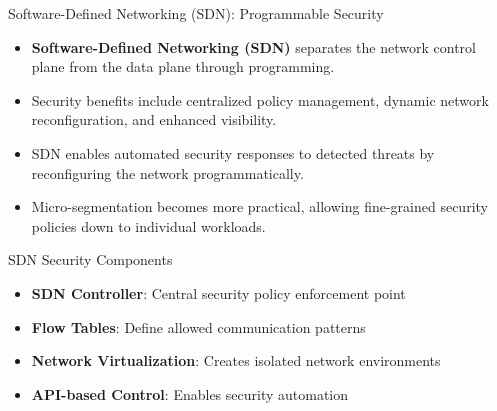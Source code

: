 \documentclass{beamer}
\begin{document}
        \begin{frame}{Software-Defined Networking (SDN): Programmable Security}
            \begin{itemize}
            \item \textbf{Software-Defined Networking (SDN)} separates the network control plane from the data plane through programming.
            \item Security benefits include centralized policy management, dynamic network reconfiguration, and enhanced visibility.
            \item SDN enables automated security responses to detected threats by reconfiguring the network programmatically.
            \item Micro-segmentation becomes more practical, allowing fine-grained security policies down to individual workloads.
            \end{itemize}
            
            \begin{block}{SDN Security Components}
            \begin{itemize}
            \item \textbf{SDN Controller}: Central security policy enforcement point
            \item \textbf{Flow Tables}: Define allowed communication patterns
            \item \textbf{Network Virtualization}: Creates isolated network environments
            \item \textbf{API-based Control}: Enables security automation
            \end{itemize}
            \end{block}
            \end{frame}
            
\end{document}
